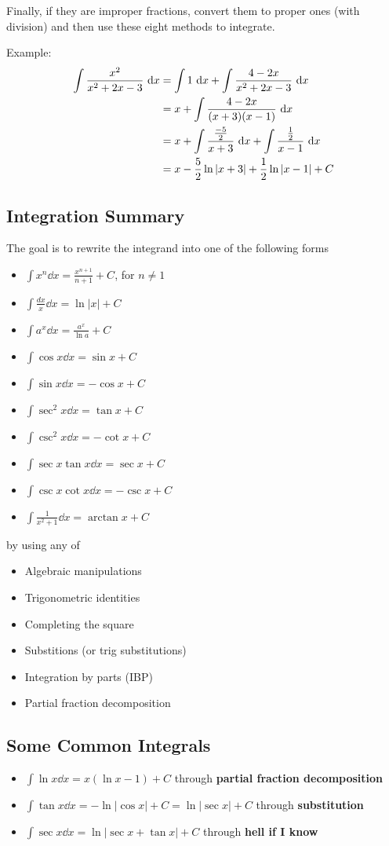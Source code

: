 \documentclass[12pt]{article}
\newcommand{\inint}[2]{\int #1 \dd #2}
\begin{document}
Finally, if they are improper fractions, convert them to proper ones (with division) and then use these eight methods to integrate.

Example:
\begin{align*}
\inint{\frac{x^2}{x^2+2x-3}}{x} &= \inint{1}{x} + \inint{\frac{4-2x}{x^2+2x-3}}{x}\\
&= x + \inint{\frac{4-2x}{(x+3)(x-1)}}{x}\\
&= x + \inint{\frac{\frac{-5}{2}}{x+3}}{x} + \inint{\frac{\half }{x-1}}{x}\\
&= x - \frac{5}{2}\ln|x+3| + \half \ln|x-1| + C
\end{align*}

\subsection*{Integration Summary}
The goal is to rewrite the integrand into one of the following forms
\begin{itemize}
\item $\inint{x^n}{x} = \frac{x^{n+1}}{n+1} + C$, for $n \neq 1$
\item $\inint{\frac{dx}{x}}{x} = \ln|x| + C$
\item $\inint{a^x}{x} = \frac{a^x}{\ln a} + C$
\item $\inint{\cos x}{x} = \sin x + C$
\item $\inint{\sin x}{x} = -\cos x + C$
\item $\inint{\sec^2 x}{x} = \tan x + C$
\item $\inint{\csc^2 x}{x} = -\cot x + C$
\item $\inint{\sec x\tan x}{x} = \sec x + C$
\item $\inint{\csc x\cot x}{x} = -\csc x + C$
\item $\inint{\frac{1}{x^2+1}}{x} = \arctan x + C$
\end{itemize}
by using any of
\begin{itemize}
\item Algebraic manipulations
\item Trigonometric identities
\item Completing the square
\item Substitions (or trig substitutions)
\item Integration by parts (IBP)
\item Partial fraction decomposition
\end{itemize}

\subsection*{Some Common Integrals}
\begin{itemize}
\item $\inint{\ln x}{x} = x(\ln x - 1) + C$ through {\bf partial fraction decomposition}
\item $\inint{\tan x}{x} = -\ln |\cos x| + C = \ln |\sec x| + C$ through {\bf substitution}
\item $\inint{\sec x}{x} = \ln |\sec x + \tan x| + C$ through {\bf hell if I know}
\end{itemize}
\end{document}
